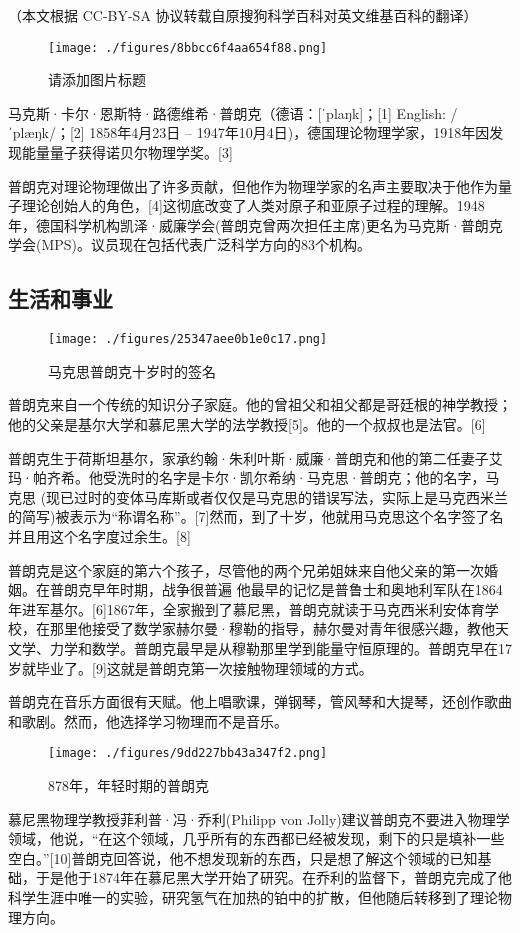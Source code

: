 
（本文根据 CC-BY-SA 协议转载自原搜狗科学百科对英文维基百科的翻译）
\begin{figure}[ht]
\centering
\texttt{[image: ./figures/8bbcc6f4aa654f88.png]}
\caption{请添加图片标题} \label{fig_Max_7}
\end{figure}

马克斯·卡尔·恩斯特·路德维希·普朗克（德语：[ˈplaŋk]；[1] English: /ˈplæŋk/；[2] 1858年4月23日 – 1947年10月4日)，德国理论物理学家，1918年因发现能量量子获得诺贝尔物理学奖。[3]

普朗克对理论物理做出了许多贡献，但他作为物理学家的名声主要取决于他作为量子理论创始人的角色，[4]这彻底改变了人类对原子和亚原子过程的理解。1948年，德国科学机构凯泽·威廉学会(普朗克曾两次担任主席)更名为马克斯·普朗克学会(MPS)。议员现在包括代表广泛科学方向的83个机构。

\subsection{生活和事业}
\begin{figure}[ht]
\centering
\texttt{[image: ./figures/25347aee0b1e0c17.png]}
\caption{马克思普朗克十岁时的签名} \label{fig_Max_1}
\end{figure}
普朗克来自一个传统的知识分子家庭。他的曾祖父和祖父都是哥廷根的神学教授；他的父亲是基尔大学和慕尼黑大学的法学教授[5]。他的一个叔叔也是法官。[6]

普朗克生于荷斯坦基尔，家承约翰·朱利叶斯·威廉·普朗克和他的第二任妻子艾玛·帕齐希。他受洗时的名字是卡尔·凯尔希纳·马克思·普朗克；他的名字，马克思 (现已过时的变体马库斯或者仅仅是马克思的错误写法，实际上是马克西米兰的简写)被表示为“称谓名称”。[7]然而，到了十岁，他就用马克思这个名字签了名并且用这个名字度过余生。[8]

普朗克是这个家庭的第六个孩子，尽管他的两个兄弟姐妹来自他父亲的第一次婚姻。在普朗克早年时期，战争很普遍 他最早的记忆是普鲁士和奥地利军队在1864年进军基尔。[6]1867年，全家搬到了慕尼黑，普朗克就读于马克西米利安体育学校，在那里他接受了数学家赫尔曼·穆勒的指导，赫尔曼对青年很感兴趣，教他天文学、力学和数学。普朗克最早是从穆勒那里学到能量守恒原理的。普朗克早在17岁就毕业了。[9]这就是普朗克第一次接触物理领域的方式。

普朗克在音乐方面很有天赋。他上唱歌课，弹钢琴，管风琴和大提琴，还创作歌曲和歌剧。然而，他选择学习物理而不是音乐。
\begin{figure}[ht]
\centering
\texttt{[image: ./figures/9dd227bb43a347f2.png]}
\caption{878年，年轻时期的普朗克} \label{fig_Max_2}
\end{figure}
慕尼黑物理学教授菲利普·冯·乔利(Philipp von Jolly)建议普朗克不要进入物理学领域，他说，“在这个领域，几乎所有的东西都已经被发现，剩下的只是填补一些空白。”[10]普朗克回答说，他不想发现新的东西，只是想了解这个领域的已知基础，于是他于1874年在慕尼黑大学开始了研究。在乔利的监督下，普朗克完成了他科学生涯中唯一的实验，研究氢气在加热的铂中的扩散，但他随后转移到了理论物理方向。

